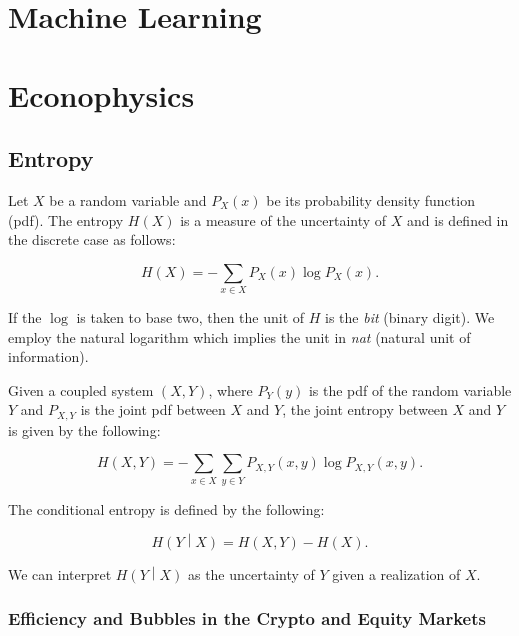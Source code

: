 \documentclass[]{book}
\theoremstyle{definition}
\theoremstyle{definition}
\theoremstyle{definition}
\theoremstyle{remark}
\begin{document}
\part{Machine Learning}\label{part-machine-learning}

\part{Econophysics}\label{part-econophysics}

\chapter{Entropy}\label{entropy}

Let \(X\) be a random variable and \(P_X(x)\) be its probability density
function (pdf). The entropy \(H(X)\) is a measure of the uncertainty of
\(X\) and is defined in the discrete case as follows:

\begin{equation}
H(X) = -\sum_{x \in X}{P_X(x)\log{P_X(x)}}.
\label{eq:H}
\end{equation}

If the \(\log\) is taken to base two, then the unit of \(H\) is the
\textit{bit} (binary digit). We employ the natural logarithm which
implies the unit in \textit{nat} (natural unit of information).

Given a coupled system \((X,Y)\), where \(P_Y(y)\) is the pdf of the
random variable \(Y\) and \(P_{X,Y}\) is the joint pdf between \(X\) and
\(Y\), the joint entropy between \(X\) and \(Y\) is given by the
following:

\begin{equation}
H(X,Y) = -\sum_{x \in X}{\sum_{y \in Y}{P_{X,Y}(x,y)\log{P_{X,Y}(x,y)}}}.
\label{eq:HXY}
\end{equation}

The conditional entropy is defined by the following:

\begin{equation}
H\left(Y\middle\vert X\right) = H(X,Y) - H(X).
\end{equation}

We can interpret \(H\left(Y\middle\vert X\right)\) as the uncertainty of
\(Y\) given a realization of \(X\).

\section{Efficiency and Bubbles in the Crypto and Equity
Markets}\label{efficiency-and-bubbles-in-the-crypto-and-equity-markets}
\end{document}
